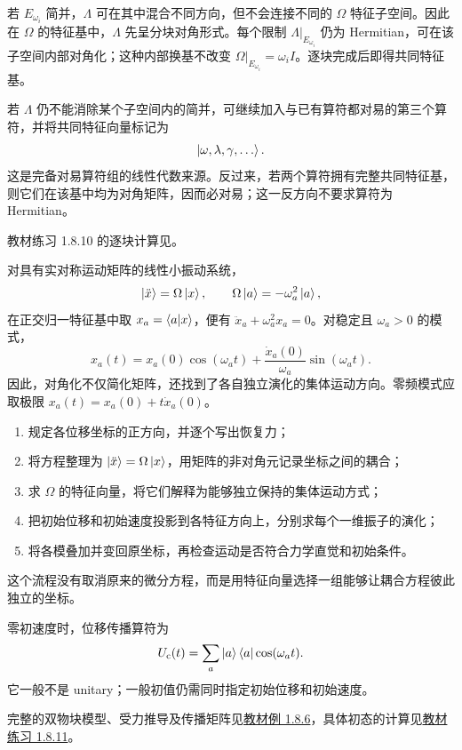 若 $E_{\omega_i}$ 简并，$\Lambda$ 可在其中混合不同方向，但不会连接不同的 $\Omega$ 特征子空间。因此在 $\Omega$ 的特征基中，$\Lambda$ 先呈分块对角形式。每个限制 $\Lambda|_{E_{\omega_i}}$ 仍为 Hermitian，可在该子空间内部对角化；这种内部换基不改变 $\Omega|_{E_{\omega_i}}=\omega_iI$。逐块完成后即得共同特征基。

若 $\Lambda$ 仍不能消除某个子空间内的简并，可继续加入与已有算符都对易的第三个算符，并将共同特征向量标记为
\[
  \left|\omega,\lambda,\gamma,\ldots\right\rangle.
\]
这是完备对易算符组的线性代数来源。反过来，若两个算符拥有完整共同特征基，则它们在该基中均为对角矩阵，因而必对易；这一反方向不要求算符为 Hermitian。

教材练习 1.8.10 的逐块计算见。


对具有实对称运动矩阵的线性小振动系统，
\[
  \left|\ddot x\right\rangle=\Omega\left|x\right\rangle,\qquad
  \Omega\left|a\right\rangle=-\omega_a^2\left|a\right\rangle,
\]
在正交归一特征基中取 $x_a=\left\langle a \middle| x \right\rangle$，便有 $\ddot x_a+\omega_a^2x_a=0$。对稳定且 $\omega_a>0$ 的模式，
\[
  x_a(t)=x_a(0)\cos(\omega_at)
  +\frac{\dot x_a(0)}{\omega_a}\sin(\omega_at).
\]
因此，对角化不仅简化矩阵，还找到了各自独立演化的集体运动方向。零频模式应取极限 $x_a(t)=x_a(0)+t\dot x_a(0)$。

\begin{enumerate}[leftmargin=*,itemsep=0.2em]
  \item 规定各位移坐标的正方向，并逐个写出恢复力；
  \item 将方程整理为 $\left|\ddot x\right\rangle=\Omega\left|x\right\rangle$，用矩阵的非对角元记录坐标之间的耦合；
  \item 求 $\Omega$ 的特征向量，将它们解释为能够独立保持的集体运动方式；
  \item 把初始位移和初始速度投影到各特征方向上，分别求每个一维振子的演化；
  \item 将各模叠加并变回原坐标，再检查运动是否符合力学直觉和初始条件。
\end{enumerate}
这个流程没有取消原来的微分方程，而是用特征向量选择一组能够让耦合方程彼此独立的坐标。

零初速度时，位移传播算符为
\[
  U_{\mathrm c}(t)=\sum_a\left|a\right\rangle\left\langle a\right|\cos(\omega_at).
\]
它一般不是 unitary；一般初值仍需同时指定初始位移和初始速度。

完整的双物块模型、受力推导及传播矩阵见\hyperref[exercise:QM-C01-S08-E06]{教材例 1.8.6}，具体初态的计算见\hyperref[exercise:QM-C01-S08-E05]{教材练习 1.8.11}。

